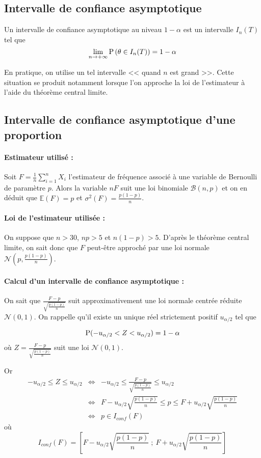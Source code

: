 \subsection{Intervalle de confiance asymptotique}
Un intervalle de confiance asymptotique au niveau $1-\alpha$ est un intervalle $I_{n}(T)$ tel que 
$$\lim_{n \to +\infty} \operatorname{P}\left(\theta \in I_{n}(T)\right) = 1-\alpha$$

En pratique, on utilise un tel intervalle << quand $n$ est grand >>. Cette situation se produit notamment lorsque l'on approche la loi de l'estimateur à l'aide du théorème central limite.

\subsection{Intervalle de confiance asymptotique d'une proportion}
\paragraph{Estimateur utilisé :} Soit $F=\frac{1}{n}\sum_{i=1}^n X_i$ l'estimateur de fréquence associé à une variable de Bernoulli de paramètre $p$. Alors la variable $nF$ suit une loi binomiale $\mathscr{B}(n,p)$ et on en déduit que  $\mathbb{E}(F)=p$
et $\sigma^2(F) = \frac{p(1-p)}{n}$.

\paragraph{Loi de l'estimateur utilisée :}  On suppose que $n>30$, $np>5$ et $n(1-p)>5$. D'après le théorème central limite, on sait donc que $F$ peut-être approché par une loi normale $\mathcal{N}\left(p,\frac{p(1-p)}{n}\right)$. 

\paragraph{Calcul d'un intervalle de confiance asymptotique :}  On sait que $\frac{F-p}{\sqrt{\frac{p(1-p)}{n}}}$ suit approximativement une loi normale centrée réduite $\mathcal{N}(0,1)$. On rappelle qu'il existe un unique réel strictement positif $u_{\alpha/2}$ tel que 

$$\operatorname{P}(-u_{\alpha/2} < Z < u_{\alpha/2}) = 1-\alpha$$
où $Z=\frac{F-p}{\sqrt{\frac{p(1-p)}{n}}}$ suit une loi $\mathcal{N}(0,1)$.

Or \begin{eqnarray*}
	-u_{\alpha/2} \leq Z \leq u_{\alpha/2} & \iff & -u_{\alpha/2} \leq \frac{F-p}{\sqrt{\frac{p(1-p)}{n}}} \leq u_{\alpha/2} \\
	& \iff & F-u_{\alpha/2} {\sqrt{\frac{p(1-p)}{n}}}  \leq p \leq F + u_{\alpha/2}{\sqrt{\frac{p(1-p)}{n}}} \\
	& \iff & p \in I_{conf}(F)
\end{eqnarray*}
où $$I_{conf}(F)=\left[F-u_{\alpha/2} {\sqrt{\frac{p(1-p)}{n}}} ~;~ F + u_{\alpha/2}{\sqrt{\frac{p(1-p)}{n}}} \right]$$ 

